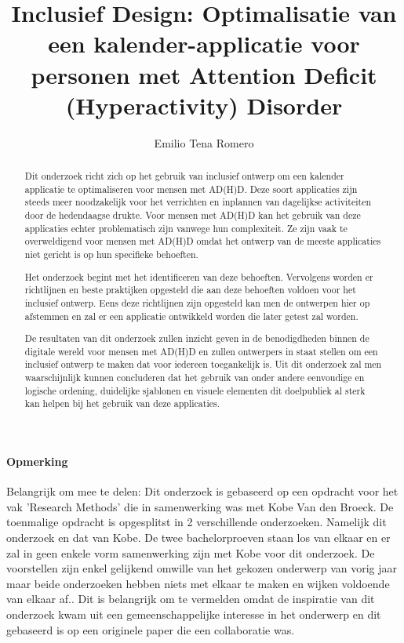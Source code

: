 \documentclass{hogent-article}
\title{Inclusief Design: Optimalisatie van een kalender-applicatie voor personen met Attention Deficit (Hyperactivity) Disorder}
\author{Emilio Tena Romero}
\begin{document}
\begin{abstract}
  Dit onderzoek richt zich op het gebruik van inclusief ontwerp om een kalender applicatie te optimaliseren voor mensen met AD(H)D. Deze soort applicaties zijn steeds meer noodzakelijk voor het verrichten en inplannen van dagelijkse activiteiten door de hedendaagse drukte. Voor mensen met AD(H)D kan het gebruik van deze applicaties echter problematisch zijn vanwege hun complexiteit. Ze zijn vaak te overweldigend voor mensen met AD(H)D omdat het ontwerp van de meeste applicaties niet gericht is op hun specifieke behoeften. 
  
  Het onderzoek begint met het identificeren van deze behoeften. Vervolgens worden er richtlijnen en beste praktijken opgesteld die aan deze behoeften voldoen voor het inclusief ontwerp. Eens deze richtlijnen zijn opgesteld kan men de ontwerpen hier op afstemmen en zal er een applicatie ontwikkeld worden die later getest zal worden.
  
  De resultaten van dit onderzoek zullen inzicht geven in de benodigdheden binnen de digitale wereld voor mensen met AD(H)D en zullen ontwerpers in staat stellen om een inclusief ontwerp te maken dat voor iedereen toegankelijk is. Uit dit onderzoek zal men waarschijnlijk kunnen concluderen dat het gebruik van onder andere eenvoudige en logische ordening, duidelijke sjablonen en visuele elementen dit doelpubliek al sterk kan helpen bij het gebruik van deze applicaties.
\end{abstract}

\tableofcontents


\paragraph{Opmerking}
Belangrijk om mee te delen: \newline
Dit onderzoek is gebaseerd op een opdracht voor het vak 'Research Methods' die in samenwerking was met Kobe Van den Broeck.
De toenmalige opdracht is opgesplitst in 2 verschillende onderzoeken. Namelijk dit onderzoek en dat van Kobe. 
\newline \newline
De twee bachelorproeven staan los van elkaar en er zal in geen enkele vorm samenwerking zijn met Kobe voor dit onderzoek. De voorstellen zijn enkel gelijkend omwille van het gekozen onderwerp van vorig jaar maar beide onderzoeken hebben niets met elkaar te maken en wijken voldoende van elkaar af..
\newline \newline
Dit is belangrijk om te vermelden omdat de inspiratie van dit onderzoek kwam uit een gemeenschappelijke interesse in het onderwerp en dit gebaseerd is op een originele paper die een collaboratie was.  



\printbibliography[heading=bibintoc]
\end{document}
